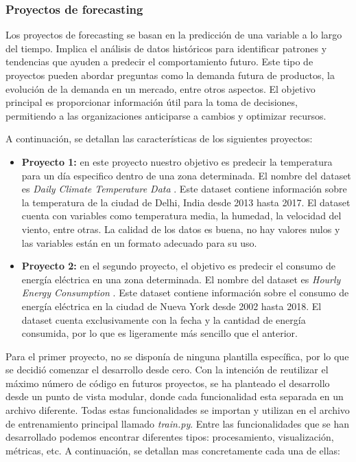 \subsubsection{Proyectos de forecasting}
Los proyectos de forecasting se basan en la predicción de una variable a lo largo del tiempo.
Implica el análisis de datos históricos para identificar patrones y tendencias que ayuden 
a predecir el comportamiento futuro. Este tipo de proyectos pueden abordar preguntas como la 
demanda futura de productos, la evolución de la demanda en un mercado, entre otros aspectos. 
El objetivo principal es proporcionar información útil para la toma de decisiones, permitiendo a 
las organizaciones anticiparse a cambios y optimizar recursos.\medskip

A continuación, se detallan las características de los siguientes proyectos:
\begin{itemize}
    \item \textbf{Proyecto 1:} en este proyecto nuestro objetivo es predecir 
    la temperatura para un día especifico dentro de una zona determinada. 
     El nombre del dataset es \textit{Daily Climate Temperature Data}
    \cite{Daily_Climate}. Este dataset contiene información sobre la temperatura
    de la ciudad de Delhi, India desde 2013 hasta 2017. El dataset cuenta con
    variables como temperatura media, la humedad, la velocidad del viento, entre otras.
    La calidad de los datos es buena, no hay valores nulos y las variables están
    en un formato adecuado para su uso.
    \item \textbf{Proyecto 2:} en el segundo proyecto, el objetivo es predecir
    el consumo de energía eléctrica en una zona determinada. El nombre del dataset
    es \textit{Hourly Energy Consumption} \cite{Hourly_Energy}. Este dataset contiene
    información sobre el consumo de energía eléctrica en la ciudad de Nueva York desde
    2002 hasta 2018. El dataset cuenta exclusivamente con la fecha y la cantidad de energía
    consumida, por lo que es ligeramente más sencillo que el anterior.
\end{itemize}

Para el primer proyecto, no se disponía de ninguna plantilla específica, por lo que se 
decidió comenzar el desarrollo desde cero. Con la intención de reutilizar el máximo
número de código en futuros proyectos, se ha planteado el desarrollo desde un punto
de vista modular, donde cada funcionalidad esta separada en un archivo diferente.
Todas estas funcionalidades se importan y utilizan en el archivo de entrenamiento
principal llamado \textit{train.py}. Entre las funcionalidades que se han desarrollado
podemos encontrar diferentes tipos: procesamiento, visualización, métricas, etc. A continuación,
se detallan mas concretamente cada una de ellas:

